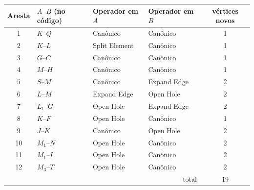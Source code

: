 \begin{tabular}{clllc}
\toprule
Aresta & $A$--$B$ (no código) & Operador em $A$ & Operador em $B$ & vértices novos\\
\midrule
1 & $K$--$Q$ & Canônico & Canônico & 1 \\
2 & $K$--$L$ & Split Element & Canônico & 1 \\
3 & $G$--$C$ & Canônico & Canônico & 1 \\
4 & $M$--$H$ & Canônico & Canônico & 1 \\
5 & $S$--$M$ & Canônico & Expand Edge & 2 \\
6 & $L$--$M$ & Expand Edge & Open Hole & 2 \\
7 & $L_{1}$--$G$ & Open Hole & Expand Edge & 2 \\
8 & $K$--$F$ & Open Hole & Canônico & 1 \\
9 & $J$--$K$ & Canônico & Open Hole & 2 \\
10 & $M_{1}$--$N$ & Open Hole & Canônico & 2 \\
11 & $M_{1}$--$I$ & Open Hole & Canônico & 2 \\
12 & $M_{3}$--$T$ & Open Hole & Canônico & 2 \\
\midrule
\multicolumn{4}{r}{total} & 19\\
\bottomrule
\end{tabular}
